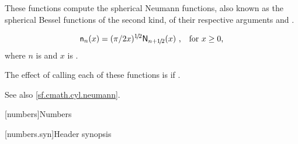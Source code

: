 \begin{itemdescr}
\pnum
\effects
These functions compute the spherical Neumann functions,
also known as the spherical Bessel functions of the second kind,
of their respective arguments
 and .

\pnum
\returns
\[ \mathsf{n}_n(x) = (\pi/2x)^{1\!/\!2} \mathsf{N}_{n + 1\!/\!2}(x)
   \text{ ,\quad for $x \ge 0$,} \]
where
$n$ is  and
$x$ is .

\pnum
\remarks
The effect of calling each of these functions
is 
if .

\pnum
See also \ref{sf.cmath.cyl.neumann}.
\end{itemdescr}


[numbers]{Numbers}

[numbers.syn]{Header  synopsis}

